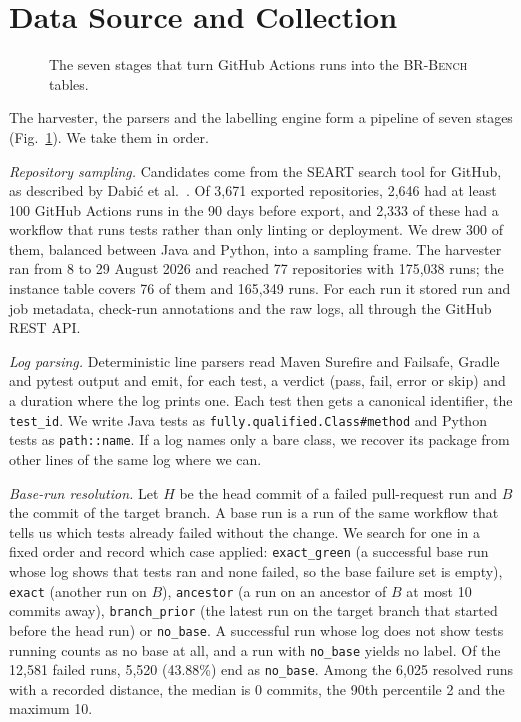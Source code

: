 \documentclass[10pt,conference]{IEEEtran}
\begin{document}
\section{Data Source and Collection}
\label{sec:collection}

\begin{figure}[t]
\centering

\caption{The seven stages that turn GitHub Actions runs into the \textsc{BR-Bench} tables.}
\label{fig:pipeline}
\end{figure}

The harvester, the parsers and the labelling engine form a pipeline of seven stages (Fig.~\ref{fig:pipeline}). We take them in order.

\textit{Repository sampling.} Candidates come from the SEART search tool for GitHub, as described by Dabi\'c et al.~\cite{dabic2021sampling}. Of 3,671 exported repositories, 2,646 had at least 100 GitHub Actions runs in the 90 days before export, and 2,333 of these had a workflow that runs tests rather than only linting or deployment. We drew 300 of them, balanced between Java and Python, into a sampling frame. The harvester ran from 8 to 29 August 2026 and reached 77 repositories with 175,038 runs; the instance table covers 76 of them and 165,349 runs. For each run it stored run and job metadata, check-run annotations and the raw logs, all through the GitHub REST API.

\textit{Log parsing.} Deterministic line parsers read Maven Surefire and Failsafe, Gradle and pytest output and emit, for each test, a verdict (pass, fail, error or skip) and a duration where the log prints one. Each test then gets a canonical identifier, the \texttt{test\_id}. We write Java tests as \texttt{fully.qualified.Class\#method} and Python tests as \texttt{path::name}. If a log names only a bare class, we recover its package from other lines of the same log where we can.

\textit{Base-run resolution.} Let $H$ be the head commit of a failed pull-request run and $B$ the commit of the target branch. A base run is a run of the same workflow that tells us which tests already failed without the change. We search for one in a fixed order and record which case applied: \texttt{exact\_green} (a successful base run whose log shows that tests ran and none failed, so the base failure set is empty), \texttt{exact} (another run on $B$), \texttt{ancestor} (a run on an ancestor of $B$ at most 10 commits away), \texttt{branch\_prior} (the latest run on the target branch that started before the head run) or \texttt{no\_base}. A successful run whose log does not show tests running counts as no base at all, and a run with \texttt{no\_base} yields no label. Of the 12,581 failed runs, 5,520 (43.88\%) end as \texttt{no\_base}. Among the 6,025 resolved runs with a recorded distance, the median is 0 commits, the 90th percentile 2 and the maximum 10.
\end{document}
